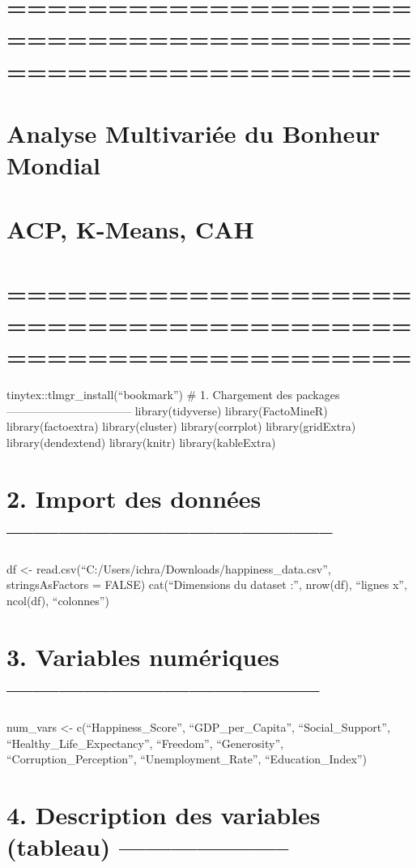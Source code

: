 \documentclass[
]{article}
\author{}
\date{\vspace{-2.5em}}
\begin{document}
\section{============================================================}\label{section}

\section{Analyse Multivariée du Bonheur
Mondial}\label{analyse-multivariuxe9e-du-bonheur-mondial}

\section{ACP, K-Means, CAH}\label{acp-k-means-cah}

\section{============================================================}\label{section-1}

tinytex::tlmgr\_install(``bookmark'') \# 1. Chargement des packages
--------------------------------- library(tidyverse) library(FactoMineR)
library(factoextra) library(cluster) library(corrplot)
library(gridExtra) library(dendextend) library(knitr)
library(kableExtra)

\section{2. Import des données
--------------------------------------}\label{import-des-donnuxe9es}

df \textless- read.csv(``C:/Users/ichra/Downloads/happiness\_data.csv'',
stringsAsFactors = FALSE) cat(``Dimensions du dataset :'', nrow(df),
``lignes x'', ncol(df), ``colonnes\n'')

\section{3. Variables numériques
------------------------------------}\label{variables-numuxe9riques}

num\_vars \textless- c(``Happiness\_Score'', ``GDP\_per\_Capita'',
``Social\_Support'', ``Healthy\_Life\_Expectancy'', ``Freedom'',
``Generosity'', ``Corruption\_Perception'', ``Unemployment\_Rate'',
``Education\_Index'')

\section{4. Description des variables (tableau)
--------------------}\label{description-des-variables-tableau}
\end{document}
